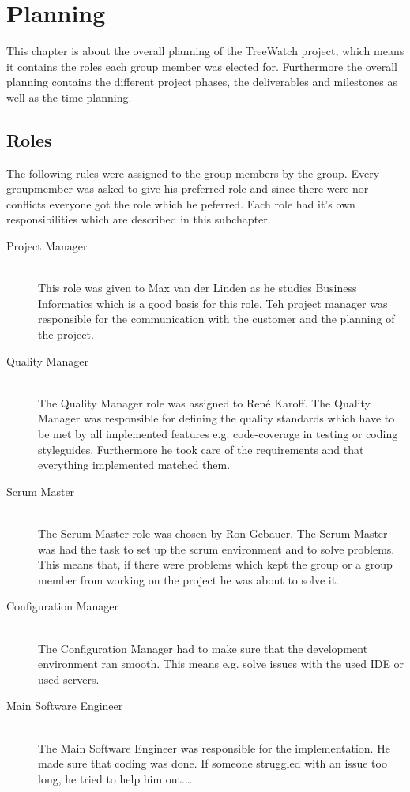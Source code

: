 \section{Planning}
This chapter is about the overall planning of the TreeWatch project, which means it contains the roles each group member was elected for. Furthermore the overall planning contains the different project phases, the deliverables and milestones as well as the time-planning.
\subsection{Roles}
The following rules were assigned to the group members by the group. Every groupmember was asked to give his preferred role and since there were nor conflicts everyone got the role which he peferred. Each role had it's own responsibilities which are described in this subchapter.
\begin{description}
	\item[Project Manager] \hfill \\
	This role was given to Max van der Linden as he studies Business Informatics which is a good basis for this role. Teh project manager was responsible for the communication with the customer and the planning of the project.
	\item[Quality Manager] \hfill \\
	The Quality Manager  role was assigned to René Karoff. The Quality Manager was responsible for defining the quality standards which have to be met by all implemented features e.g. code-coverage in testing or coding styleguides. Furthermore he took care of the requirements and that everything implemented matched them.
	\item[Scrum Master] \hfill \\
	The Scrum Master role was chosen by Ron Gebauer. The Scrum Master was had the task to set up the scrum environment and to solve problems. This means that, if there were problems which kept the group or a group member from working on the project he was about to solve it.
	\item[Configuration Manager] \hfill \\
	The Configuration Manager had to make sure that the development environment ran smooth. This means e.g. solve issues with the used IDE or used servers.
	\item[Main Software Engineer] \hfill \\
	The Main Software Engineer was responsible for the implementation. He made sure that coding was done. If someone struggled with an issue too long, he tried to help him out.\ldots
\end{description}






